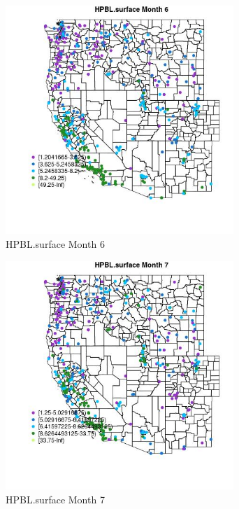 \begin{figure} 
\centering  
\includegraphics[width=0.77\textwidth]{Code_Outputs/ML_input_report_ML_input_PM25_Step5_part_d_de_duplicated_aves_ML_input_MapObsMo6HPBLsurface.jpg} 
\caption{\label{fig:ML_input_report_ML_input_PM25_Step5_part_d_de_duplicated_aves_ML_inputMapObsMo6HPBLsurface}HPBL.surface Month 6} 
\end{figure} 
 

\begin{figure} 
\centering  
\includegraphics[width=0.77\textwidth]{Code_Outputs/ML_input_report_ML_input_PM25_Step5_part_d_de_duplicated_aves_ML_input_MapObsMo7HPBLsurface.jpg} 
\caption{\label{fig:ML_input_report_ML_input_PM25_Step5_part_d_de_duplicated_aves_ML_inputMapObsMo7HPBLsurface}HPBL.surface Month 7} 
\end{figure} 
 

